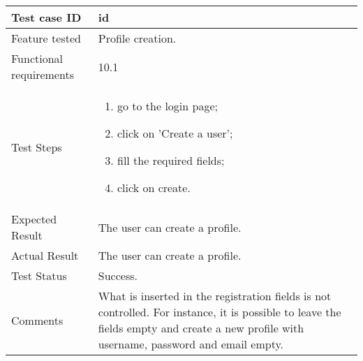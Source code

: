 \begin{table}[H]
	\begin{center}
		\begin{tabular}{ | p{} | p{} | }
		\hline
		Test case ID & id\\
		\hline
		Feature tested & Profile creation.\\
    	\hline
		Functional requirements & 10.1  \\
		\hline
		Test Steps & 
			\begin{enumerate}
				\item go to the login page;
				\item click on 'Create a user';
				\item fill the required fields;
				\item click on create.
			\end{enumerate} \\
		\hline
		Expected Result & The user can create a profile.\\
		\hline
		Actual Result & The user can create a profile.\\ 
		\hline
		Test Status & \color{ForestGreen}Success.\\ 
		\hline
		Comments & What is inserted in the registration fields is not controlled. For instance, it is possible to leave the fields empty and create a new profile with username, password and email empty. \\
		\hline
		
		\end{tabular}
	\end{center}
\end{table}
